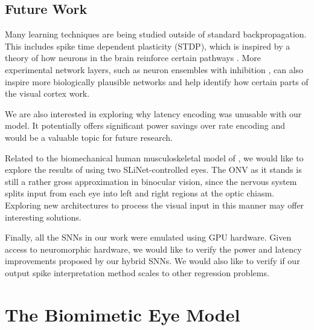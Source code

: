 \documentclass [MS] {UCLAthesis}
\begin{document}
\section{Future Work}


Many learning techniques are being studied outside of standard backpropagation. This includes spike time dependent plasticity (STDP), which is inspired by a theory of how neurons in the brain reinforce certain pathways \citep{stdp}. More experimental network layers, such as neuron ensembles with inhibition \citep{nengo}, can also inspire more biologically plausible networks and help identify how certain parts of the visual cortex work.

We are also interested in exploring why latency encoding was unusable with our model. It potentially offers significant power savings over rate encoding and would be a valuable topic for future research.

Related to the biomechanical human musculoskeletal model of \citet{Masaki}, we would like to explore the results of using two SLiNet-controlled eyes. The ONV as it stands is still a rather gross approximation in binocular vision, since the nervous system splits input from each eye into left and right regions at the optic chiasm. Exploring new architectures to process the visual input in this manner may offer interesting solutions. 

Finally, all the SNNs in our work were emulated using GPU hardware. Given access to neuromorphic hardware, we would like to verify the power and latency improvements proposed by our hybrid SNNs. We would also like to verify if our output spike interpretation method scales to other regression problems.



\appendix


\chapter{The Biomimetic Eye Model}
\label{appendix:eye}
\end{document}
